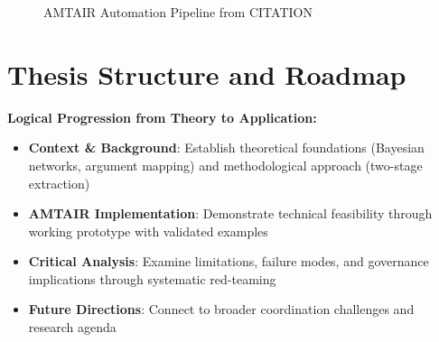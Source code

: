 \documentclass[
  11pt,
  letterpaper,
]{book}
\providecommand{\tightlist}{%
  \setlength{\itemsep}{0pt}\setlength{\parskip}{0pt}}
\begin{document}
\begin{figure}


\caption[Five-step AMTAIR automation pipeline from PDFs to Bayesian
networks]{\label{fig-automation_pipeline}AMTAIR Automation Pipeline from
CITATION}

\end{figure}%

\section{Thesis Structure and Roadmap}\label{sec-roadmap}

\textbf{Logical Progression from Theory to Application:}

\begin{itemize}
\tightlist
\item
  \textbf{Context \& Background}: Establish theoretical foundations
  (Bayesian networks, argument mapping) and methodological approach
  (two-stage extraction)
\item
  \textbf{AMTAIR Implementation}: Demonstrate technical feasibility
  through working prototype with validated examples
\item
  \textbf{Critical Analysis}: Examine limitations, failure modes, and
  governance implications through systematic red-teaming
\item
  \textbf{Future Directions}: Connect to broader coordination challenges
  and research agenda
\end{itemize}
\end{document}

